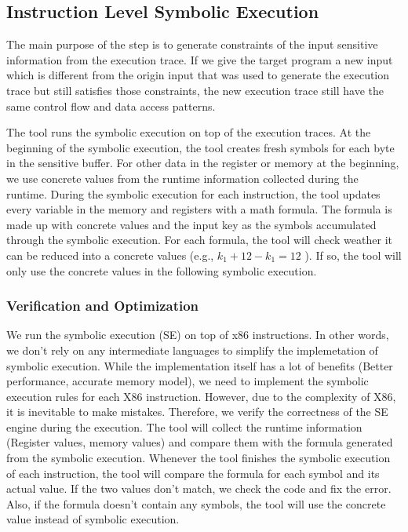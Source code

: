 \subsection{Instruction Level Symbolic Execution}
\label{InstructionSE}
The main purpose of the step is to generate 
constraints of the input sensitive information from the execution trace. 
If we give the target program a new input which 
is different from the origin input that was used 
to generate the execution trace but still satisfies those constraints,
the new execution trace still have the same control flow and 
data access patterns. 

The tool runs the symbolic execution on top of the execution traces.
At the beginning of the symbolic execution, the tool creates fresh 
symbols for each byte in the sensitive buffer. For other data in the 
register or memory at the beginning, we use concrete values from the 
runtime information collected during the runtime. 
During the symbolic execution for each instruction, 
the tool updates every variable in the memory and registers with a
math formula. The formula is made up with concrete values and 
the input key as the symbols accumulated through the symbolic execution.
For each formula, the tool will check weather it can be reduced
into a concrete values (e.g., $k_1+12-k_1 = 12$ ). 
If so, the tool will only use the concrete values in the 
following symbolic execution.

\subsubsection{Verification and Optimization}
We run the symbolic execution (SE) on top of x86 instructions.
In other words, we don't rely on any intermediate languages to 
simplify the implemetation of symbolic execution. 
While the implementation itself 
has a lot of benefits (Better performance, accurate memory model), 
we need to implement the symbolic execution 
rules for each X86 instruction. 
However, due to the complexity of X86, it is inevitable to make mistakes. 
Therefore, we verify the correctness of the SE engine during the execution. 
The tool will collect the runtime information (Register values, 
memory values) and compare them with the formula generated from the 
symbolic execution. Whenever the tool finishes the symbolic execution 
of each instruction, the tool will compare the formula for each symbol 
and its actual value. If the two values don't match, we check the code
and fix the error. Also, if the formula doesn't contain any symbols,
the tool will use the concrete value instead of symbolic execution.

